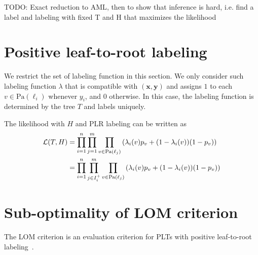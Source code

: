 \documentclass{article}
\newcommand{\cL}{\mathcal{L}}
\newcommand{\path}{\text{Pa}}
\renewcommand{\vec}[1]{\mathbf{#1}}
\newcommand{\bx}{\mathbf{x}}
\newcommand{\by}{\vec{y}}
\newcommand{\Algo}[1]{\textsc{#1}}
\begin{document}
TODO: Exact reduction to \Algo{AML}, then to show that inference is hard, i.e. find a label and labeling with fixed T and H that maximizes the likelihood

\section{Positive leaf-to-root labeling}

We restrict the set of labeling function in this section. We only consider such labeling function $\lambda$ that is compatible with $(\bx, \by )$ and assigns $1$ to each $v\in \path(\ell_i)$ whenever $y_i$, and $0$ otherwise. In this case, the labeling function is determined by the tree $T$ and labels uniquely. 

The likelihood with $H$ and PLR labeling can be written as
\begin{align}
\cL ( T, H) 
  & = \prod_{i=1}^{n} \prod_{j=1}^m \prod_{v \in \path(\ell_j)} \left( \lambda_i (v) p_v + (1-\lambda_i (v) ) (1-p_v) \right) \notag \\
  & = \prod_{i=1}^{n} \prod_{j\in I_i^{+}}^m \prod_{v \in \path(\ell_j)} \left( \lambda_i (v) p_v + (1-\lambda_i (v) ) (1-p_v) \right) \notag \\
\end{align}

\section{Sub-optimality of \Algo{LOM} criterion}

The \Algo{LOM} criterion is an evaluation criterion for PLTs with positive leaf-to-root labeling~\citep{Choromanska_Langford_2015}.



\end{document}
